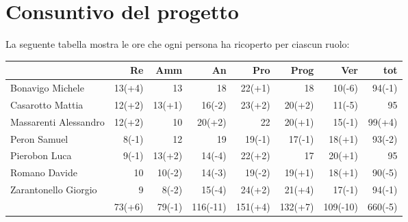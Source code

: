 \section{Consuntivo del progetto}

La seguente tabella mostra le ore che ogni persona ha ricoperto per ciascun ruolo:
\begin{table}[H]
    \begin{tabularx}{\linewidth}{X|rrrrrrr}
    \rowcolor{gray!30}& Re & Amm & An & Pro & Prog & Ver & tot \\
    \hline
    Bonavigo Michele                        & 13(+4)    & 13       & 18          & 22(+1)    & 18          & 10(-6)     & 94(-1) \\

    \rowcolor{gray!10}Casarotto Mattia      & 12(+2)    & 13(+1)   & 16(-2)      & 23(+2)    & 20(+2)      & 11(-5)     & 95 \\

    Massarenti Alessandro                   & 12(+2)    & 10       & 20(+2)      & 22        & 20(+1)      & 15(-1)     & 99(+4) \\

    \rowcolor{gray!10}Peron Samuel          & 8(-1)     & 12       & 19          & 19(-1)    & 17(-1)      & 18(+1)     & 93(-2) \\ 

    Pierobon Luca                           & 9(-1)     & 13(+2)   & 14(-4)      & 22(+2)    & 17          & 20(+1)     & 95 \\ 

    \rowcolor{gray!10}Romano Davide         & 10        & 10(-2)   & 14(-3)      & 19(-2)    & 19(+1)      & 18(+1)     & 90(-5) \\ 

    Zarantonello Giorgio                    & 9         & 8(-2)    & 15(-4)      & 24(+2)    & 21(+4)      & 17(-1)     & 94(-1) \\ 

    \hline                                  & 73(+6)    & 79(-1)   & 116(-11)    & 151(+4)   & 132(+7)     & 109(-10)   & 660(-5) \\  
    \end{tabularx}
\end{table} 

